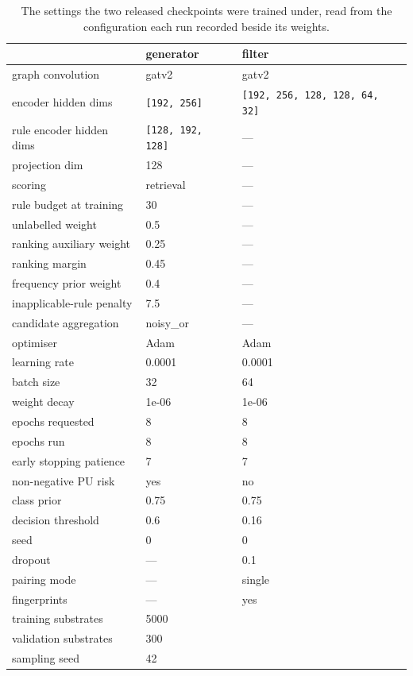 \begin{table}[h]
\centering\footnotesize
\begin{threeparttable}
\caption{The settings the two released checkpoints were trained under, read from the configuration each run recorded beside its weights.}
\label{tab:si-hyperparameters}
\begin{tabular}{lll}
\toprule
 & generator & filter \\
\midrule
graph convolution & gatv2 & gatv2 \\
encoder hidden dims & \texttt{[192, 256]} & \texttt{[192, 256, 128, 128, 64, 32]} \\
rule encoder hidden dims & \texttt{[128, 192, 128]} & --- \\
projection dim & 128 & --- \\
scoring & retrieval & --- \\
rule budget at training & 30 & --- \\
unlabelled weight & 0.5 & --- \\
ranking auxiliary weight & 0.25 & --- \\
ranking margin & 0.45 & --- \\
frequency prior weight & 0.4 & --- \\
inapplicable-rule penalty & 7.5 & --- \\
candidate aggregation & noisy\_or & --- \\
optimiser & Adam & Adam \\
learning rate & 0.0001 & 0.0001 \\
batch size & 32 & 64 \\
weight decay & 1e-06 & 1e-06 \\
epochs requested & 8 & 8 \\
epochs run & 8 & 8 \\
early stopping patience & 7 & 7 \\
non-negative PU risk & yes & no \\
class prior & 0.75 & 0.75 \\
decision threshold & 0.6 & 0.16 \\
seed & 0 & 0 \\
dropout & --- & 0.1 \\
pairing mode & --- & single \\
fingerprints & --- & yes \\
\midrule
training substrates & \multicolumn{2}{l}{5000} \\
validation substrates & \multicolumn{2}{l}{300} \\
sampling seed & \multicolumn{2}{l}{42} \\

\end{tabular}
\end{threeparttable}
\end{table}
